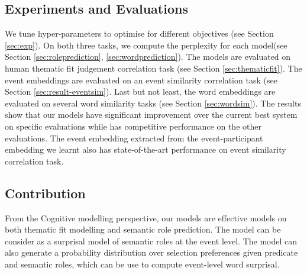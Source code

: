 \documentclass[a4paper]{article}
\begin{document}
\subsection{Experiments and Evaluations} \label{sec:eval-steps}
We tune hyper-parameters to optimise for different objectives (see Section \ref{sec:exp}). On both three tasks, we compute the perplexity for each model(see Section \ref{sec:roleprediction}, \ref{sec:wordprediction}). The models are evaluated on human thematic fit judgement correlation task (see Section \ref{sec:thematicfit}). The event embeddings are evaluated on an event similarity correlation task (see Section \ref{sec:result-eventsim}). Last but not least, the word embeddings are evaluated on several word similarity tasks (see Section \ref{sec:wordsim}). The results show that our models have significant improvement over the current best system on specific evaluations while has competitive performance on the other evaluations. The event embedding extracted from the event-participant embedding we learnt also has state-of-the-art performance on event similarity correlation task. 
% 
% 
% 
%
% 
%


\subsection{Contribution} \label{sec:contribution}
From the Cognitive modelling perspective, our models are effective models on both thematic fit modelling and semantic role prediction. The model can be consider as a surprisal model of semantic roles at the event level. The model can also generate a probability distribution over selection preferences given predicate and semantic roles, which can be use to compute event-level word surprisal. 
\end{document}
